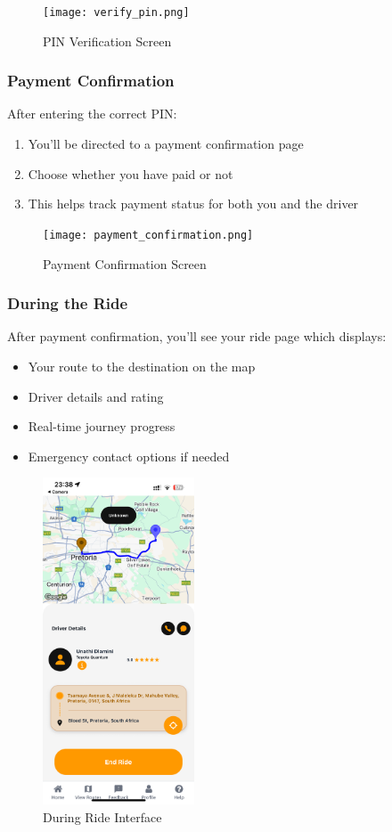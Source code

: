 \documentclass[12pt]{article}
\begin{document}
\begin{figure}[H]
  \centering
  \texttt{[image: verify\_pin.png]}
  \caption{PIN Verification Screen}
\end{figure}

\subsubsection{Payment Confirmation}
After entering the correct PIN:
\begin{enumerate}
    \item You'll be directed to a payment confirmation page
    \item Choose whether you have paid or not
    \item This helps track payment status for both you and the driver
\end{enumerate}

\begin{figure}[H]
  \centering
  \texttt{[image: payment\_confirmation.png]}
  \caption{Payment Confirmation Screen}
\end{figure}

\subsubsection{During the Ride}
After payment confirmation, you'll see your ride page which displays:
\begin{itemize}
    \item Your route to the destination on the map
    \item Driver details and rating
    \item Real-time journey progress
    \item Emergency contact options if needed
\end{itemize}

\begin{figure}[H]
  \centering
  \includegraphics[width=0.4\textwidth]{during_ride.png}
  \caption{During Ride Interface}
\end{figure}
\end{document}
